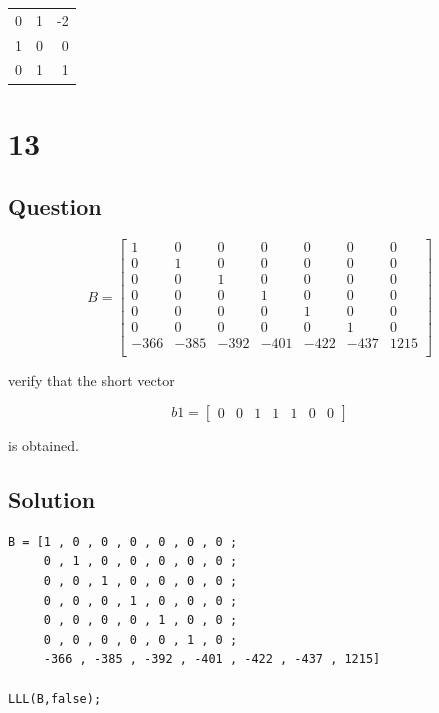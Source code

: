 \documentclass[11pt,a4paper,final]{article}
\begin{document}
\begin{center}
\begin{tabular}{rrr}
0 & 1 & -2\\
1 & 0 & 0\\
0 & 1 & 1\\
\end{tabular}
\end{center}

\section{13}
\label{sec:orgdb9724d}
\subsection{Question}
\label{sec:org94dca37}
\begin{equation}
B =
\begin{bmatrix}
1 & 0 & 0 & 0 & 0 & 0 & 0 \\
0 & 1 & 0 & 0 & 0 & 0 & 0 \\
0 & 0 & 1 & 0 & 0 & 0 & 0 \\
0 & 0 & 0 & 1 & 0 & 0 & 0 \\
0 & 0 & 0 & 0 & 1 & 0 & 0 \\
0 & 0 & 0 & 0 & 0 & 1 & 0 \\
-366 & -385 & -392 & -401 & -422 & -437 & 1215 \\
\end{bmatrix}
\end{equation}

verify that the short vector

\begin{equation}
b1 =
\begin{bmatrix}
0 & 0 & 1 & 1 & 1 & 0 & 0
\end{bmatrix}
\end{equation}

is obtained.

\subsection{Solution}
\label{sec:org1459751}
\begin{verbatim}
B = [1 , 0 , 0 , 0 , 0 , 0 , 0 ;
     0 , 1 , 0 , 0 , 0 , 0 , 0 ;
     0 , 0 , 1 , 0 , 0 , 0 , 0 ;
     0 , 0 , 0 , 1 , 0 , 0 , 0 ;
     0 , 0 , 0 , 0 , 1 , 0 , 0 ;
     0 , 0 , 0 , 0 , 0 , 1 , 0 ;
     -366 , -385 , -392 , -401 , -422 , -437 , 1215]

LLL(B,false);
\end{verbatim}
\end{document}
